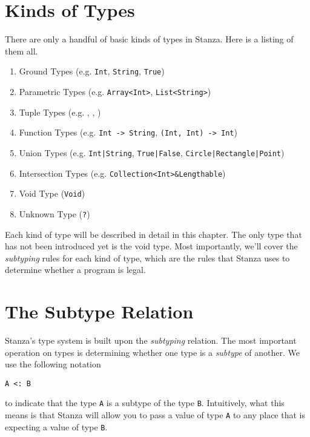 \documentclass[10pt,oneside]{book}
\begin{document}
\section{Kinds of Types}
There are only a handful of basic kinds of types in Stanza. Here is a listing of them all.
\begin{enumerate}
\item Ground Types (e.g. \texttt{\frenchspacing Int}, \texttt{\frenchspacing String}, \texttt{\frenchspacing True})
\item Parametric Types (e.g. \texttt{\frenchspacing Array<Int>}, \texttt{\frenchspacing List<String>})
\item Tuple Types (e.g. \texttt{\frenchspacing [Int]}, \texttt{}, \texttt{})
\item Function Types (e.g. \texttt{\frenchspacing Int -> String}, \texttt{\frenchspacing (Int, Int) -> Int})
\item Union Types (e.g. \texttt{\frenchspacing Int|String}, \texttt{\frenchspacing True|False}, \texttt{\frenchspacing Circle|Rectangle|Point})
\item Intersection Types (e.g. \texttt{\frenchspacing Collection<Int>\&Lengthable})
\item Void Type (\texttt{\frenchspacing Void})
\item Unknown Type (\texttt{\frenchspacing ?})
\end{enumerate}

Each kind of type will be described in detail in this chapter. The only type that has not been introduced yet is the void type. Most importantly, we'll cover the {\em subtyping} rules for each kind of type, which are the rules that Stanza uses to determine whether a program is legal.

\section{The Subtype Relation}
Stanza's type system is built upon the {\em subtyping} relation. The most important operation on types is determining whether one type is a {\em subtype} of another.  We use the following notation
\begin{lstlisting}
A <: B
\end{lstlisting}
to indicate that the type \texttt{\frenchspacing A} is a subtype of the type \texttt{\frenchspacing B}. Intuitively, what this means is that Stanza will allow you to pass a value of type \texttt{\frenchspacing A} to any place that is expecting a value of type \texttt{\frenchspacing B}.
\end{document}
